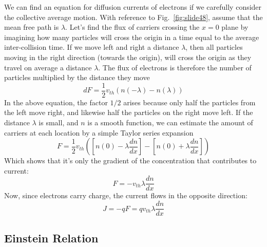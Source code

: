 We can find an equation for diffusion currents of electrons if we carefully consider the collective average motion.  With reference to Fig.~\ref{fig:slide48}, assume that the mean free path is $\lambda$.  Let’s find the flux of carriers crossing the $x=0$ plane by imagining how many particles will cross the origin in a time equal to the average inter-collision time.  If we move left and right a distance $\lambda$, then all particles moving in the right direction (towards the origin), will cross the origin as they travel on average a distance $\lambda$.  The flux of electrons is therefore the number of particles multiplied by the distance they move
\begin{equation}d
        F = \frac{1}{2}{v_{th}}\left( {n( - \lambda ) - n(\lambda )} \right)
\end{equation}
In the above equation, the factor $1/2$ arises because only half the particles from the left move right, and likewise half the particles on the right move left.  If the distance $\lambda$ is small, and $n$ is a smooth function, we can estimate the amount of carriers at each location by a simple Taylor series expansion
\begin{equation}
        F = \frac{1}{2}{v_{th}}\left( {\left[ {n(0) - \lambda \frac{{dn}}{{dx}}} \right] -
         \left[ {n(0) + \lambda \frac{{dn}}{{dx}}} \right]} \right)
\end{equation}
Which shows that it’s only the gradient of the concentration that contributes to current:
\begin{equation}
        F =  - {v_{th}}\lambda \frac{{dn}}{{dx}}
\end{equation}
Now, since electrons carry charge, the current flows in the opposite direction:
\begin{equation}
        J =  - qF = q{v_{th}}\lambda \frac{{dn}}{{dx}}
\end{equation}





\subsection{Einstein Relation}
 
